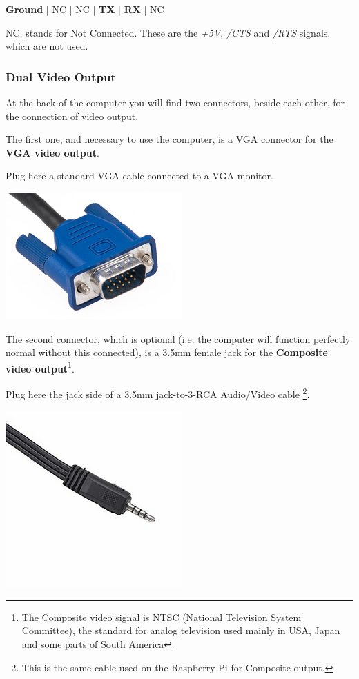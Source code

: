         \textbf{Ground} | NC | NC | \textbf{TX} | \textbf{RX} | NC

        NC, stands for Not Connected. These are the \textit{+5V}, \textit{/CTS}
        and \textit{/RTS} signals, which are not used.



        \subsubsection{Dual Video Output}

        At the back of the computer you will find two connectors, beside each
        other, for the connection of video output.

        The first one, and necessary to use the computer, is a VGA connector for
        the \textbf{VGA video output}.
        
        Plug here a standard VGA cable connected to a VGA monitor.

        \centerline{\includegraphics[scale=0.5]{images/vgaconn.png}}

        The second connector, which is optional (i.e. the computer will function
        perfectly normal without this connected), is a 3.5mm female jack for the
        \textbf{Composite video output}\footnote{The Composite video signal is
        NTSC (National Television System Committee), the standard for analog
        television used mainly in USA, Japan and some parts of South America}.

        Plug here the jack side of a 3.5mm jack-to-3-RCA Audio/Video cable
        \footnote{This is the same cable used on the Raspberry Pi for Composite
        output.}.

        \centerline{\includegraphics[scale=0.5]{images/raspicable_jack.png}}

